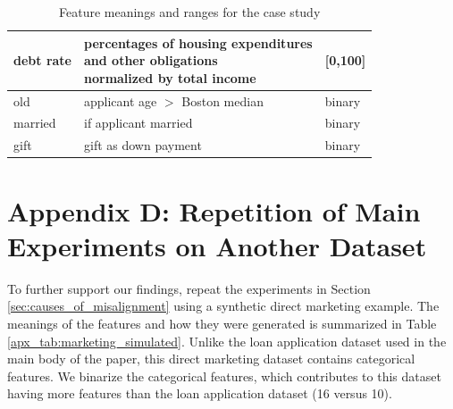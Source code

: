 \documentclass[mnsc,blindrev]{informs3}
\begin{document}
\begin{table}[ht!]
\begin{tabular}{l|l|l}
            debt rate           & \makecell[l]{percentages of housing expenditures \\ and other obligations \\ normalized by total income}    & {[}0,100{]}                   \\ \hline
            old              & applicant age $>$ Boston median & binary                        \\ \hline
            married          & if applicant married               & binary                        \\ \hline
            gift             & gift as down payment               & binary                         \\
            \bottomrule
            \end{tabular}
            \caption{Feature meanings and ranges for the case study}
            \label{apx_tab:case_study_features}
        \end{table}


  

    
    
    \section*{Appendix D: Repetition of Main Experiments on Another Dataset}
        \label{apx_sec:marketing}
        To further support our findings, repeat the experiments in Section \ref{sec:causes_of_misalignment} using a synthetic direct marketing example. The meanings of the features and how they were generated is summarized in Table \ref{apx_tab:marketing_simulated}. Unlike the loan application dataset used in the main body of the paper, this direct marketing dataset contains categorical features. We binarize the categorical features, which contributes to this dataset having more features than the loan application dataset (16 versus 10). 
\end{document}
